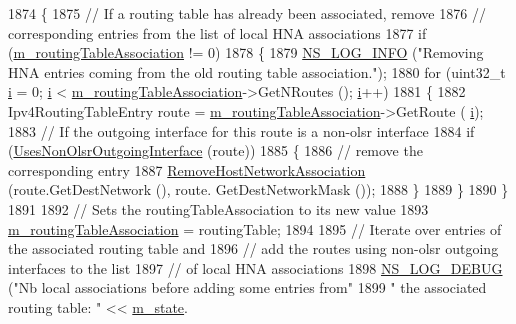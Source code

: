 \begin{DoxyCode}
1874 \{
1875   \textcolor{comment}{// If a routing table has already been associated, remove}
1876   \textcolor{comment}{// corresponding entries from the list of local HNA associations}
1877   \textcolor{keywordflow}{if} (\hyperlink{classns3_1_1olsr_1_1RoutingProtocol_ae631ae3941f563718274166203d3b178}{m\_routingTableAssociation} != 0)
1878     \{
1879       \hyperlink{group__logging_gafbd73ee2cf9f26b319f49086d8e860fb}{NS\_LOG\_INFO} (\textcolor{stringliteral}{"Removing HNA entries coming from the old routing table association."});
1880       \textcolor{keywordflow}{for} (uint32\_t \hyperlink{bernuolliDistribution_8m_a6f6ccfcf58b31cb6412107d9d5281426}{i} = 0; \hyperlink{bernuolliDistribution_8m_a6f6ccfcf58b31cb6412107d9d5281426}{i} < \hyperlink{classns3_1_1olsr_1_1RoutingProtocol_ae631ae3941f563718274166203d3b178}{m\_routingTableAssociation}->GetNRoutes (); 
      \hyperlink{bernuolliDistribution_8m_a6f6ccfcf58b31cb6412107d9d5281426}{i}++)
1881         \{
1882           Ipv4RoutingTableEntry route = \hyperlink{classns3_1_1olsr_1_1RoutingProtocol_ae631ae3941f563718274166203d3b178}{m\_routingTableAssociation}->GetRoute (
      \hyperlink{bernuolliDistribution_8m_a6f6ccfcf58b31cb6412107d9d5281426}{i});
1883           \textcolor{comment}{// If the outgoing interface for this route is a non-olsr interface}
1884           \textcolor{keywordflow}{if} (\hyperlink{classns3_1_1olsr_1_1RoutingProtocol_ae4f144aababb20e17a8cfc7c0823bb89}{UsesNonOlsrOutgoingInterface} (route))
1885             \{
1886               \textcolor{comment}{// remove the corresponding entry}
1887               \hyperlink{classns3_1_1olsr_1_1RoutingProtocol_a06c4bb2917ebc46ab608d4c9c3c4cbaa}{RemoveHostNetworkAssociation} (route.GetDestNetwork (), route.
      GetDestNetworkMask ());
1888             \}
1889         \}
1890     \}
1891 
1892   \textcolor{comment}{// Sets the routingTableAssociation to its new value}
1893   \hyperlink{classns3_1_1olsr_1_1RoutingProtocol_ae631ae3941f563718274166203d3b178}{m\_routingTableAssociation} = routingTable;
1894 
1895   \textcolor{comment}{// Iterate over entries of the associated routing table and}
1896   \textcolor{comment}{// add the routes using non-olsr outgoing interfaces to the list}
1897   \textcolor{comment}{// of local HNA associations}
1898   \hyperlink{group__logging_ga413f1886406d49f59a6a0a89b77b4d0a}{NS\_LOG\_DEBUG} (\textcolor{stringliteral}{"Nb local associations before adding some entries from"}
1899                 \textcolor{stringliteral}{" the associated routing table: "} << \hyperlink{classns3_1_1olsr_1_1RoutingProtocol_a07942ec1a7df71b609c8d2ff3b567c49}{m\_state}.

\end{DoxyCode}
